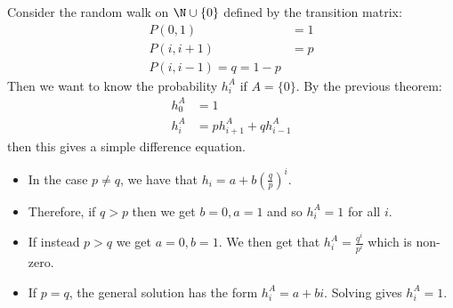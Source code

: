 \documentclass[../Main.tex]{subfiles}
\begin{document}
\begin{example}
    Consider the random walk on $\N \cup \{0\}$ defined by the transition matrix:
    \begin{align*}
        P(0, 1) &= 1 \\
        P(i, i+1) &= p \\
        P(i, i-1) = q = 1-p
    \end{align*}
    Then we want to know the probability $h_i^A$ if $A = \{0\}$. By the previous theorem:
    \begin{align*}
        h_0^A &= 1 \\
        h_i^A &= ph_{i+1}^A + qh_{i-1}^A 
    \end{align*}
    then this gives a simple difference equation.
    \begin{itemize}
        \item In the case $p \neq q$, we have that $h_i = a + b\left(\frac{q}{p}\right)^i$. \item Therefore, if $q > p$ then we get $b = 0, a = 1$ and so $h_i^A = 1$ for all $i$.
        \item If instead $p > q$ we get $a = 0, b = 1$. We then get that $h_i^A = \frac{q^i}{p^i}$ which is non-zero.
        \item If $p = q$, the general solution has the form $h_i^A = a + bi$. Solving gives $h_i^A = 1$.
    \end{itemize}
\end{example}
\end{document}
